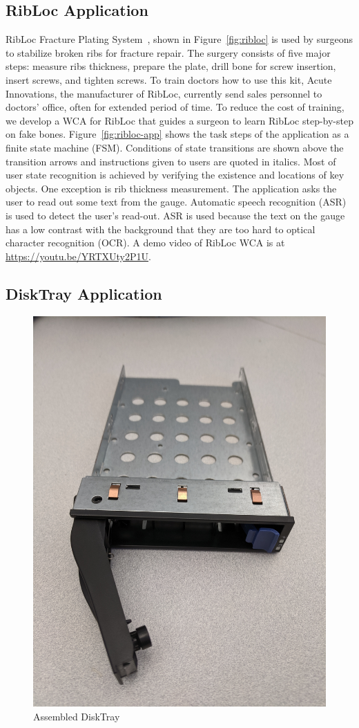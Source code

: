 \subsection{RibLoc Application}

RibLoc Fracture Plating System~\cite{ribloc}, shown in Figure~\ref{fig:ribloc}
is used by surgeons to stabilize broken ribs for fracture repair. The surgery
consists of five major steps: measure ribs thickness, prepare the plate, drill
bone for screw insertion, insert screws, and tighten screws. To train doctors
how to use this kit, Acute Innovations, the manufacturer of RibLoc, currently
send sales personnel to doctors' office, often for extended period of time. To
reduce the cost of training, we develop a WCA for RibLoc that guides a surgeon
to learn RibLoc step-by-step on fake bones. Figure~\ref{fig:ribloc-app} shows
the task steps of the application as a finite state machine (FSM). Conditions of
state transitions are shown above the transition arrows and instructions given
to users are quoted in italics. Most of user state recognition is achieved by
verifying the existence and locations of key objects. One exception is rib
thickness measurement. The application asks the user to read out some text from
the gauge. Automatic speech recognition (ASR) is used to detect the user's
read-out. ASR is used because the text on the gauge has a low contrast with the
background that they are too hard to optical character recognition (OCR). A demo
video of RibLoc WCA is at \url{https://youtu.be/YRTXUty2P1U}.

\subsection{DiskTray Application}

\begin{figure}
\centering
\includegraphics[width=0.3\linewidth]{FIGS/disktray.jpg}
\caption{Assembled DiskTray}
\label{fig:disktray}
\end{figure}

